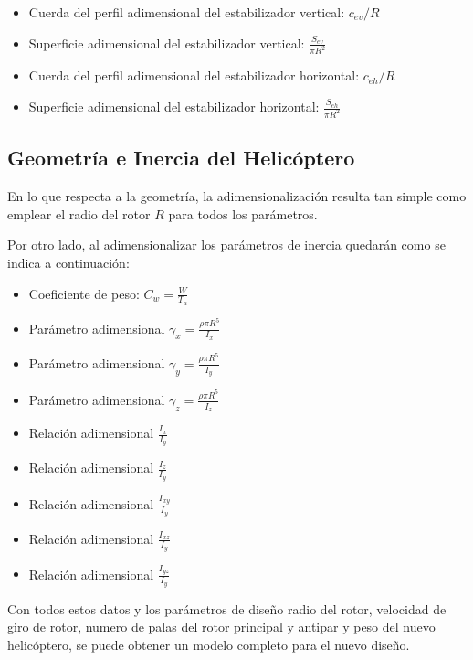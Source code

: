 \begin{multicols}{2}
	\begin{itemize}
		\item Cuerda del perfil adimensional del estabilizador vertical: $c_{ev}/R$
		\item Superficie adimensional del estabilizador vertical: $\frac{S_{ev}}{\pi R^2}$
		\item Cuerda del perfil adimensional del estabilizador horizontal: $c_{eh}/R$
		\item Superficie adimensional del estabilizador horizontal: $\frac{S_{eh}}{\pi R^2}$
	\end{itemize}
\end{multicols}

\subsection{Geometría e Inercia del Helicóptero}

En lo que respecta a la geometría, la adimensionalización resulta tan simple como emplear el radio del rotor $R$ para todos los parámetros.

Por otro lado, al adimensionalizar los parámetros de inercia quedarán como se indica a continuación:

\begin{multicols}{2}
	\begin{itemize}
		\item Coeficiente de peso: $C_w=\frac{W}{T_u}$
		\item Parámetro adimensional $\gamma_x=\frac{\rho\pi R^5}{I_x}$
		\item Parámetro adimensional $\gamma_y=\frac{\rho\pi R^5}{I_y}$
		\item Parámetro adimensional $\gamma_z=\frac{\rho\pi R^5}{I_z}$
		\item Relación adimensional $\frac{I_x}{I_y}$
		\item Relación adimensional $\frac{I_z}{I_y}$
		\item Relación adimensional $\frac{I_{xy}}{I_y}$
		\item Relación adimensional $\frac{I_{xz}}{I_y}$
		\item Relación adimensional $\frac{I_{yz}}{I_y}$
	\end{itemize}
\end{multicols}

Con todos estos datos y los parámetros de diseño radio del rotor, velocidad de giro de rotor, numero de palas del rotor principal y antipar y peso del nuevo helicóptero, se puede obtener un modelo completo para el nuevo diseño.

